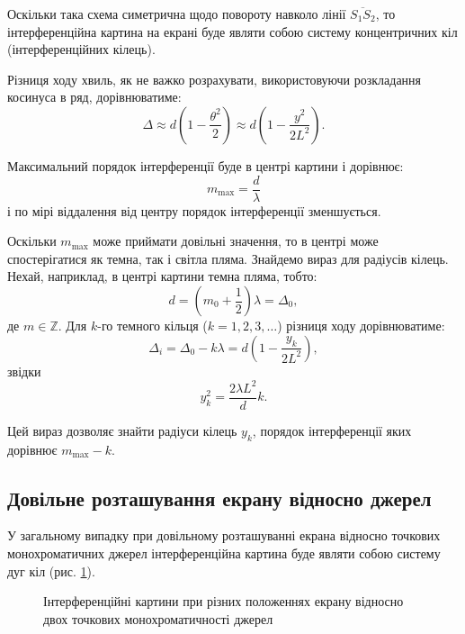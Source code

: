 Оскільки така схема симетрична щодо повороту навколо лінії $\overline{S_1S_2}$, то інтерференційна картина на екрані буде являти собою систему концентричних кіл (інтерференційних кілець).

Різниця ходу хвиль, як не важко розрахувати, використовуючи розкладання косинуса в ряд, дорівнюватиме:
\begin{equation}\label{key}
    \Delta \approx d\left( 1 - \frac{\theta^2}{2}\right) \approx d\left( 1 - \frac{y^2}{2L^2}\right).
\end{equation}

Максимальний порядок інтерференції буде в центрі картини і дорівнює:
\[
    m_{\max} = \frac{d}{\lambda}
\]
і по мірі віддалення від центру порядок інтерференції зменшується. 

Оскільки $m_{\max}$ може приймати довільні значення, то в центрі може
спостерігатися як темна, так і світла пляма. Знайдемо вираз для радіусів
кілець. Нехай, наприклад, в центрі картини темна пляма, тобто:
\[
    d = \left( m_0 + \frac12 \right)\lambda = \Delta_0, 
\]
де $m \in \mathbb{Z}$.  Для $k$-го темного кільця ($k = 1,2,3,\ldots$) різниця ходу дорівнюватиме:
\[
    \Delta_i = \Delta_0 - k\lambda = d\left( 1 - \frac{y_k}{2L^2}\right),
\]
звідки
\begin{equation}\label{eq:RingRadius}
    y_k^2 = \frac{2\lambda L^2}{d} k.
\end{equation}

Цей вираз дозволяє знайти радіуси кілець $y_k$, порядок інтерференції яких дорівнює $m_{\max} - k$.

\subsection{Довільне розташування екрану відносно джерел}

У загальному випадку при довільному розташуванні екрана відносно точкових монохроматичних джерел інтерференційна картина буде являти собою систему дуг кіл (рис. \ref{fig:IntPic}).

\begin{figure}
\centering
\caption{Інтерференційні картини при різних положеннях екрану
відносно двох точкових монохроматичності джерел}
\label{fig:IntPic}
\end{figure}

